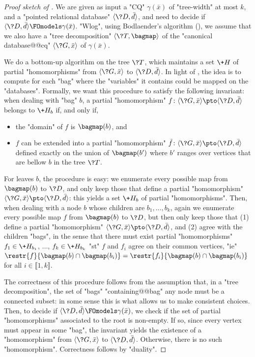 \begin{proof}[Proof sketch of {}]
	We are given as input a "CQ" $\gamma(\bar x)$ of "tree-width" at most $k$,
	and a "pointed relational database" $\tup{\?D,\bar d}$, and need
	to decide if $\tup{\?D, \bar d} \FOmodels \gamma(\bar x)$.
	"Wlog", using Bodlaender's algorithm (),
	we assume that we also have a "tree decomposition" $\tup{\?T,\bagmap}$
	of the "canonical database@@cq" $\tup{\?G, \bar x}$ of $\gamma(\bar x)$.

	We do a bottom-up algorithm on the tree $\?T$,
	which maintains a set $\+H$ of partial "homomorphisms" from
	$\tup{\?G, \bar x}$ to $\tup{\?D, \bar d}$.
	In light of , the idea is to compute
	for each "bag" where the "variables" it contains could be mapped
	on the "databases".
	Formally, we want this procedure
	to satisfy the following invariant:
	when dealing with "bag" $b$, a partial "homomorphism"
	$f\colon \tup{\?G, \bar x} \pto \tup{\?D, \bar d}$ belongs to $\+H_b$ if, and only if,
	\begin{itemize}
		\item the "domain" of $f$ is $\bagmap(b)$, and
		\item $f$ can be extended into a partial "homomorphism"
			$\tilde f\colon \tup{\?G, \bar x} \pto \tup{\?D, \bar d}$
			defined exactly on the union of $\bagmap(b')$ where $b'$ ranges
			over vertices that are bellow $b$ in the tree $\?T$.
	\end{itemize}
	For leaves $b$, the procedure is easy: we enumerate every possible map
	from $\bagmap(b)$ to $\?D$, and only keep those that define a 
	partial "homomorphism" $\tup{\?G, \bar x} \pto \tup{\?D, \bar d}$: this
	yields a set $\+H_b$ of partial "homomorphisms".
	Then, when dealing with a node $b$ whose children are $b_1,\hdots,b_k$,
	again we enumerate every possible map $f$
	from $\bagmap(b)$ to $\?D$, but then only keep those that
	(1) define a partial "homomorphism" $\tup{\?G, \bar x} \pto \tup{\?D, \bar d}$,
	and (2) agree with the children "bags", in the sense that there must exist
	partial "homomorphisms" $f_1 \in \+H_{b_1}$, $\dotsc$, $f_k \in \+H_{b_k}$
	"st" $f$ and $f_i$ agree on their common vertices,
	"ie" $\restr{f}{\bagmap(b)\cap \bagmap(b_i)} = \restr{f_i}{\bagmap(b)\cap \bagmap(b_i)}$
	for all $i \in \lBrack 1,k\rBrack$.
	
	The correctness of this procedure follows from the assumption that,
	in a "tree decomposition", the set of "bags" "containing@@bag" any node
	must be a connected subset: in some sense this is what allows us to make
	consistent choices.
	Then, to decide if $\tup{\?D, \bar d} \FOmodels \gamma(\bar x)$,
	we check if the set of partial "homomorphisms" associated to the root
	is non-empty. If so, since every vertex must appear in some "bag",
	the invariant yields the existence of a "homomorphism" 
	from $\tup{\?G, \bar x}$ to $\tup{\?D, \bar d}$.
	Otherwise, there is no such "homomorphism". Correctness follows by "duality".


\end{proof}
